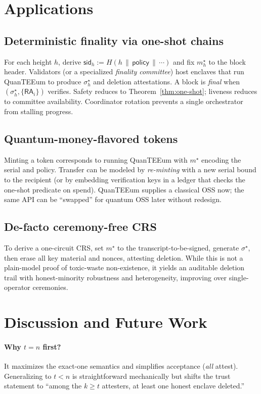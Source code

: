 \documentclass[runningheads,orivec]{llncs}
\newcommand{\prot}{\textsf{QuanTEEum}}
\newcommand{\RA}{\mathsf{RA}}
\begin{document}
\section{Applications}\label{sec:apps}
\subsection{Deterministic finality via one-shot chains}
For each height $h$, derive $\mathsf{sid}_h := H(h\,\|\,\textsf{policy}\,\|\,\cdots)$ and fix $m_h^{\star}$ to the block header. Validators (or a specialized \emph{finality committee}) host enclaves that run \prot{} to produce $\sigma_h^{\star}$ and deletion attestations. A block is \emph{final} when $(\sigma_h^{\star},\{\RA_i\})$ verifies. Safety reduces to Theorem~\ref{thm:one-shot}; liveness reduces to committee availability. Coordinator rotation prevents a single orchestrator from stalling progress.

\subsection{Quantum-money-flavored tokens}
Minting a token corresponds to running \prot{} with $m^{\star}$ encoding the serial and policy. Transfer can be modeled by \emph{re-minting} with a new serial bound to the recipient (or by embedding verification keys in a ledger that checks the one-shot predicate on spend). \prot{} supplies a classical OSS now; the same API can be “swapped” for quantum OSS later without redesign.

\subsection{De-facto ceremony-free CRS}
To derive a one-circuit CRS, set $m^{\star}$ to the transcript-to-be-signed, generate $\sigma^{\star}$, then erase all key material and nonces, attesting deletion. While this is not a plain-model proof of toxic-waste non-existence, it yields an auditable deletion trail with honest-minority robustness and heterogeneity, improving over single-operator ceremonies.

\section{Discussion and Future Work}\label{sec:discussion}
\paragraph{Why $t\!=\!n$ first?}
It maximizes the exact-one semantics and simplifies acceptance (\emph{all} attest). Generalizing to $t<n$ is straightforward mechanically but shifts the trust statement to “among the $k\!\ge\!t$ attesters, at least one honest enclave deleted.”
\end{document}
